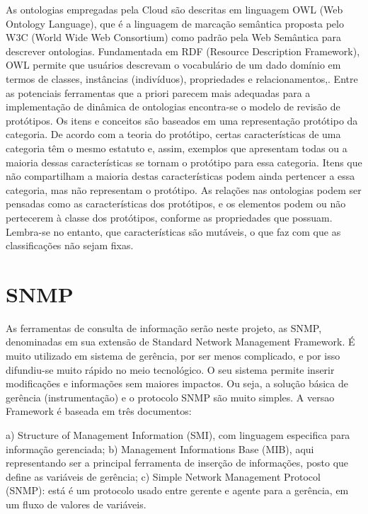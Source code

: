 As ontologias empregadas pela Cloud são descritas em linguagem OWL (Web Ontology
Language), que é a linguagem de marcação semântica proposta pelo W3C (World Wide
Web Consortium) como padrão pela Web Semântica para descrever ontologias.
Fundamentada em RDF (Resource Description Framework), OWL permite que usuários
descrevam o vocabulário de um dado domínio em termos de classes, instâncias
(indivíduos), propriedades e relacionamentos,.
Entre as potenciais ferramentas que a priori parecem mais adequadas para a
implementação de dinâmica de ontologias encontra-se o modelo de revisão de
protótipos. Os itens e conceitos são baseados em uma representação protótipo da
categoria. De acordo com a teoria do protótipo, certas características de uma
categoria têm o mesmo estatuto e, assim, exemplos que apresentam todas ou a
maioria dessas características se tornam o protótipo para essa categoria. Itens
que não compartilham a maioria destas características podem ainda pertencer a
essa categoria, mas não representam o protótipo. As relações nas ontologias
podem ser pensadas como as características dos protótipos, e os elementos podem
ou não pertecerem à classe dos protótipos, conforme as propriedades que possuam.
Lembra-se no entanto, que características são mutáveis, o que faz com que as
classificações não sejam fixas.

\lipsum[1]

\lipsum[2-3]

\chapter[SNMP]{SNMP}


As ferramentas de consulta de informação serão neste projeto, as SNMP,
denominadas em sua extensão de Standard Network Management Framework. É muito
utilizado em sistema de gerência, por ser menos complicado, e por isso
difundiu-se muito rápido no meio tecnológico. O seu sistema permite inserir
modificações e informações sem maiores impactos. Ou seja, a solução básica de
gerência (instrumentação) e o protocolo SNMP são muito simples. A versao
Framework é baseada em três documentos:

a) \textsf{Structure of Management Information (SMI)}, com linguagem especifica
para informação gerenciada; 
b) \textsf{Management Informations Base (MIB)}, aqui representando ser a
principal ferramenta de inserção de informações, posto que define as variáveis
de gerência; 
c) \textsf{Simple Network Management Protocol (SNMP)}: está é um protocolo usado
entre gerente e agente para a gerência, em um fluxo de valores de variáveis.

